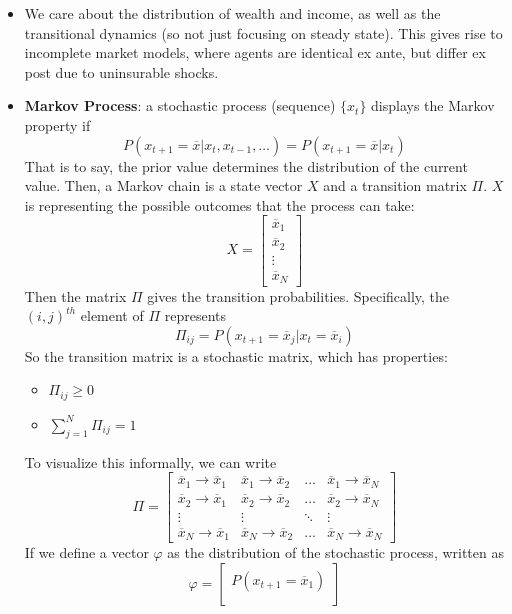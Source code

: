 \documentclass[12pt]{article}
\begin{document}
\begin{itemize}
    \item We care about the distribution of wealth and income, as well as the transitional dynamics (so not just focusing on steady state). This gives rise to incomplete market models, where agents are identical ex ante, but differ ex post due to uninsurable shocks.
    \item \textbf{Markov Process}: a stochastic process (sequence) $\{x_t\}$ displays the Markov property if
    \[P(x_{t+1} = \overline{x}|x_t,x_{t-1},\hdots)=P(x_{t+1} = \overline{x}|x_t)\]
    That is to say, the prior value determines the distribution of the current value. Then, a Markov chain is a state vector $X$ and a transition matrix $\Pi$. $X$ is representing the possible outcomes that the process can take:
    \[X = \begin{bmatrix}
    \overline{x}_1 \\
    \overline{x}_2 \\
    \vdots \\
    \overline{x}_N
    \end{bmatrix}\]
    Then the matrix $\Pi$ gives the transition probabilities. Specifically, the $(i,j)^{th}$ element of $\Pi$ represents
    \[\Pi_{ij} = P(x_{t+1} = \overline{x}_j|x_t = \overline{x}_i)\]
    So the transition matrix is a stochastic matrix, which has properties:
    \begin{itemize}
        \item $\Pi_{ij} \geq 0$
        \item $\sum_{j=1}^N\Pi_{ij} = 1$
    \end{itemize}
    To visualize this informally, we can write
    \[\Pi = \begin{bmatrix}
    \overline{x}_1 \to \overline{x}_1 & \overline{x}_1 \to \overline{x}_2 & \hdots & \overline{x}_1 \to \overline{x}_N \\
    \overline{x}_2 \to \overline{x}_1 & \overline{x}_2 \to \overline{x}_2 & \hdots & \overline{x}_2 \to \overline{x}_N \\
    \vdots & \vdots & \ddots & \vdots \\
    \overline{x}_N \to \overline{x}_1 & \overline{x}_N \to \overline{x}_2 & \hdots & \overline{x}_N \to \overline{x}_N
    \end{bmatrix}\]
    If we define a vector $\varphi$ as the distribution of the stochastic process, written as
    \[\varphi = \begin{bmatrix}
    P(x_{t+1} = \overline{x}_1) \\

\end{bmatrix}\]
\end{itemize}
\end{document}
